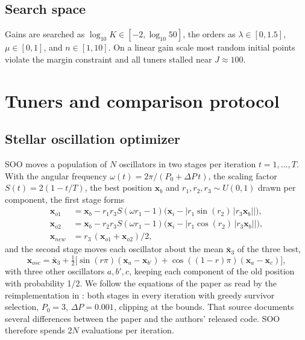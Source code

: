 \documentclass[review,12pt]{elsarticle}
\begin{document}
\subsection{Search space}
Gains are searched as $\log_{10}K\in[-2,\log_{10}50]$, the orders as $\lambda\in[0,1.5]$, $\mu\in[0,1]$, and
$n\in[1,10]$. On a linear gain scale most random initial points violate the margin constraint and all
tuners stalled near $J\approx100$.

\section{Tuners and comparison protocol}\label{sec:tuners}

\subsection{Stellar oscillation optimizer}
SOO \cite{rodan2025soo} moves a population of $N$ oscillators in two stages per iteration $t=1,\dots,T$.
With the angular frequency $\omega(t)=2\pi/(P_0+\Delta P\,t)$, the scaling factor $S(t)=2(1-t/T)$, the best
position $\boldsymbol{x}_b$ and $r_1,r_2,r_3\sim U(0,1)$ drawn per component, the first stage forms
\begin{align}
  \boldsymbol{x}_{o1} &= \boldsymbol{x}_b - r_1 r_3 S(\omega r_1-1)\big(\boldsymbol{x}_i - |r_1\sin(r_2)\,|r_3\boldsymbol{x}_b||\big),\label{eq:soo1}\\
  \boldsymbol{x}_{o2} &= \boldsymbol{x}_b - r_2 r_3 S(\omega r_1-1)\big(\boldsymbol{x}_i - |r_1\cos(r_2)\,|r_3\boldsymbol{x}_b||\big),\\
  \boldsymbol{x}_{new} &= r_3\,(\boldsymbol{x}_{o1}+\boldsymbol{x}_{o2})/2,\label{eq:soo3}
\end{align}
and the second stage moves each oscillator about the mean $\bar{\boldsymbol{x}}_3$ of the three best,
\begin{equation}
  \boldsymbol{x}_{osc} = \bar{\boldsymbol{x}}_3 + \tfrac12\big[\sin(r\pi)(\boldsymbol{x}_{a}-\boldsymbol{x}_{b'})
  + \cos((1-r)\pi)(\boldsymbol{x}_{a}-\boldsymbol{x}_{c})\big],
\end{equation}
with three other oscillators $a,b',c$, keeping each component of the old position with probability 1/2. We
follow the equations of the paper as read by the reimplementation in \cite{mealpy_soo}: both stages in every
iteration with greedy survivor selection, $P_0=3$, $\Delta P=0.001$, clipping at the bounds. That source
documents several differences between the paper and the authors' released code. SOO therefore spends $2N$
evaluations per iteration.
\end{document}
